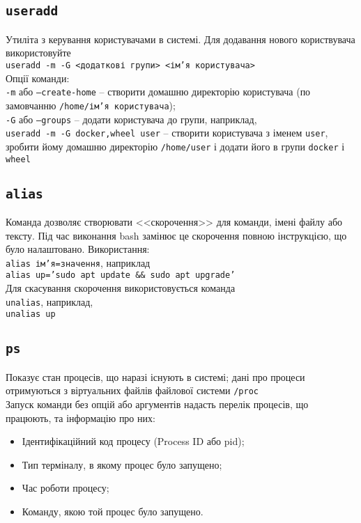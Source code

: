 \documentclass[10pt,a4paper]{fancyhandout}
\begin{document}
\subsection{\texttt{useradd}}
Утиліта з керування користувачами в системі. Для додавання нового користвувача використовуйте \\
\texttt{useradd -m -G <додаткові групи> <ім'я користувача>} \\
Опції команди: \\
\texttt{-m} або \texttt{--create-home} -- створити домашню директорію користувача (по замовчанню \texttt{/home/ім'я користувача}); \\
\texttt{-G} або \texttt{--groups} -- додати користувача до групи, наприклад, \\
\texttt{useradd -m -G docker,wheel user} -- створити користувача з іменем \texttt{user}, зробити йому домашню директорію \texttt{/home/user} і додати його в групи \texttt{docker} і \texttt{wheel} \\
\goodbreak

\subsection{\texttt{alias}}
Команда дозволяє створювати <<скорочення>> для команди, імені файлу або тексту. Під час виконання bash замінює це скорочення повною інструкцією, що було налаштовано. Використання: \\
\texttt{alias ім'я=значення}, наприклад \\
\texttt{alias up='sudo apt update \&\& sudo apt upgrade'} \\
Для скасування скорочення використовується команда \\
\texttt{unalias}, наприклад, \\
\texttt{unalias up}
\goodbreak

\subsection{\texttt{ps}}
Показує стан процесів, що наразі існують в системі; дані про процеси отримуються з віртуальних файлів файлової системи \texttt{/proc} \\
Запуск команди без опцій або аргументів надасть перелік процесів, що працюють, та інформацію про них: \\
\begin{itemize}
	\item Ідентифікаційний код процесу (Process ID або pid);
	\item Тип терміналу, в якому процес було запущено;
	\item Час роботи процесу;
	\item Команду, якою той процес було запущено.
\end{itemize}
\goodbreak
\end{document}
